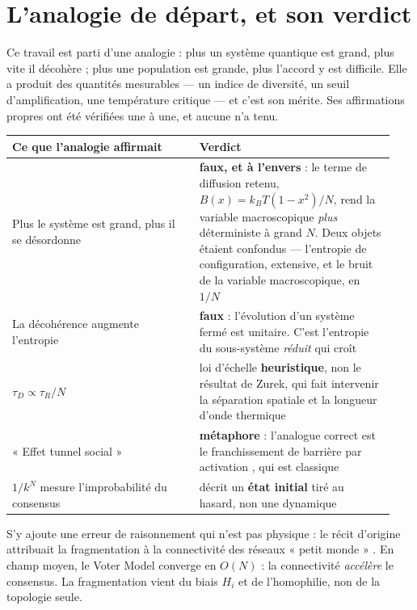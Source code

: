 \documentclass[11pt,a4paper]{article}
\begin{document}
\section{L'analogie de départ, et son verdict}
\label{sec:analogie}

Ce travail est parti d'une analogie : plus un système quantique est grand, plus vite il
décohère ; plus une population est grande, plus l'accord y est difficile. Elle a produit des
quantités mesurables --- un indice de diversité, un seuil d'amplification, une température
critique --- et c'est son mérite. Ses affirmations propres ont été vérifiées une à une, et
aucune n'a tenu.

\begin{center}
\begin{tabular}{@{}p{0.46\linewidth}p{0.48\linewidth}@{}}
\toprule
\textbf{Ce que l'analogie affirmait} & \textbf{Verdict} \\
\midrule
Plus le système est grand, plus il se désordonne & \textbf{faux, et à l'envers} : le terme de
diffusion retenu, $B(x) = k_B T (1-x^2)/N$, rend la variable macroscopique \emph{plus}
déterministe à grand $N$. Deux objets étaient confondus --- l'entropie de configuration,
extensive, et le bruit de la variable macroscopique, en $1/N$ \\[2mm]
La décohérence augmente l'entropie & \textbf{faux} : l'évolution d'un système fermé est
unitaire. C'est l'entropie du sous-système \emph{réduit} qui croît \\[2mm]
$\tau_D \propto \tau_R / N$ & loi d'échelle \textbf{heuristique}, non le résultat de Zurek,
qui fait intervenir la séparation spatiale et la longueur d'onde thermique \\[2mm]
« Effet tunnel social » & \textbf{métaphore} : l'analogue correct est le franchissement de
barrière par activation \citep{kramers1940}, qui est classique \\[2mm]
$1/k^N$ mesure l'improbabilité du consensus & décrit un \textbf{état initial} tiré au hasard,
non une dynamique \\
\bottomrule
\end{tabular}
\end{center}

S'y ajoute une erreur de raisonnement qui n'est pas physique : le récit d'origine attribuait
la fragmentation à la connectivité des réseaux « petit monde » \citep{watts1998}. En champ
moyen, le Voter Model converge en $O(N)$ : la connectivité \emph{accélère} le consensus. La
fragmentation vient du biais $H_i$ et de l'homophilie, non de la topologie seule.
\end{document}
